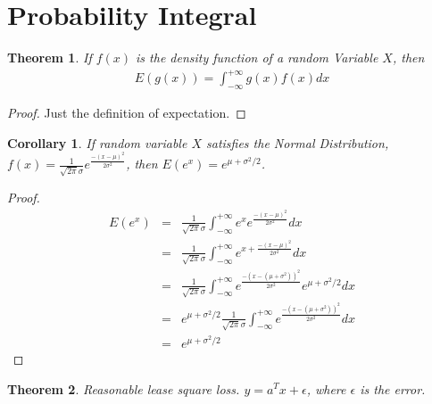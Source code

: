 \documentclass[12pt]{article}
\newtheorem{theorem}{Theorem}[section]
\newtheorem{corollary}{Corollary}[theorem]
\begin{document}
\section{Probability Integral}
\begin{theorem}
	If $f(x)$ is the density function of a random Variable $X$, then 
	\begin{eqnarray}
		E(g(x)) = \int_{-\infty}^{+\infty}g(x)f(x) dx
	\end{eqnarray}
\end{theorem}
\begin{proof}
	Just the definition of expectation. 
\end{proof}
\begin{corollary}
	If random variable $X$ satisfies the Normal Distribution, $f(x) = \frac{1}{\sqrt{2\pi}\sigma}e^{\frac{-(x-\mu)^2}{2\sigma^2}}$, then $E(e^x)=e^{\mu+\sigma^2/2}$.
\end{corollary}
\begin{proof}
\begin{eqnarray}
	E(e^x)&=&\frac{1}{\sqrt{2\pi}\sigma}\int_{-\infty}^{+\infty}e^xe^{\frac{-(x-\mu)^2}{2\sigma^2}}dx\\
	&=&\frac{1}{\sqrt{2\pi}\sigma}\int_{-\infty}^{+\infty}e^{x+\frac{-(x-\mu)^2}{2\sigma^2}}dx\\
	&=&\frac{1}{\sqrt{2\pi}\sigma}\int_{-\infty}^{+\infty}e^{\frac{-\left(x-(\mu+\sigma^2)\right)^2}{2\sigma^2}}e^{\mu+\sigma^2/2}dx\\
	&=&e^{\mu+\sigma^2/2}\frac{1}{\sqrt{2\pi}\sigma}\int_{-\infty}^{+\infty}e^{\frac{-\left(x-(\mu+\sigma^2)\right)^2}{2\sigma^2}}dx\\
	&=&e^{\mu+\sigma^2/2}
\end{eqnarray}
\end{proof}
\begin{theorem}
	Reasonable lease square loss.  $y = a^Tx + \epsilon$, where $\epsilon$ is the error.
\end{theorem}
\end{document}
